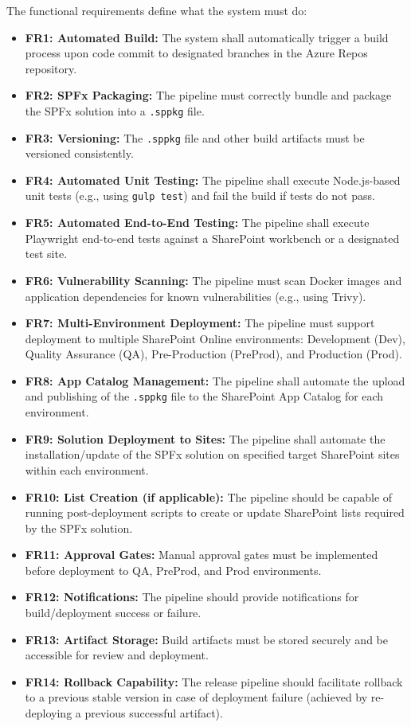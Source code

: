 The functional requirements define what the system must do:
\begin{itemize}
    \item \textbf{FR1: Automated Build:} The system shall automatically trigger a build process upon code commit to designated branches in the Azure Repos repository.
    \item \textbf{FR2: SPFx Packaging:} The pipeline must correctly bundle and package the SPFx solution into a \texttt{.sppkg} file.
    \item \textbf{FR3: Versioning:} The \texttt{.sppkg} file and other build artifacts must be versioned consistently.
    \item \textbf{FR4: Automated Unit Testing:} The pipeline shall execute Node.js-based unit tests (e.g., using \texttt{gulp test}) and fail the build if tests do not pass.
    \item \textbf{FR5: Automated End-to-End Testing:} The pipeline shall execute Playwright end-to-end tests against a SharePoint workbench or a designated test site.
    \item \textbf{FR6: Vulnerability Scanning:} The pipeline must scan Docker images and application dependencies for known vulnerabilities (e.g., using Trivy).
    \item \textbf{FR7: Multi-Environment Deployment:} The pipeline must support deployment to multiple SharePoint Online environments: Development (Dev), Quality Assurance (QA), Pre-Production (PreProd), and Production (Prod).
    \item \textbf{FR8: App Catalog Management:} The pipeline shall automate the upload and publishing of the \texttt{.sppkg} file to the SharePoint App Catalog for each environment.
    \item \textbf{FR9: Solution Deployment to Sites:} The pipeline shall automate the installation/update of the SPFx solution on specified target SharePoint sites within each environment.
    \item \textbf{FR10: List Creation (if applicable):} The pipeline should be capable of running post-deployment scripts to create or update SharePoint lists required by the SPFx solution.
    \item \textbf{FR11: Approval Gates:} Manual approval gates must be implemented before deployment to QA, PreProd, and Prod environments.
    \item \textbf{FR12: Notifications:} The pipeline should provide notifications for build/deployment success or failure.
    \item \textbf{FR13: Artifact Storage:} Build artifacts must be stored securely and be accessible for review and deployment.
    \item \textbf{FR14: Rollback Capability:} The release pipeline should facilitate rollback to a previous stable version in case of deployment failure (achieved by re-deploying a previous successful artifact).
\end{itemize}

